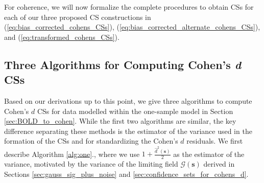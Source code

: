 For coherence, we will now formalize the complete procedures to obtain CSs for each of our three proposed CS constructions in (\ref{eq:bias_corrected_cohens_CSs}), (\ref{eq:bias_corrected_alternate_cohens_CSs}), and (\ref{eq:transformed_cohens_CSs}).

\subsection{Three Algorithms for Computing Cohen's \textit{d} CSs}
\label{sec:three_algorithms}
Based on our derivations up to this point, we give three algorithms to compute Cohen's $d$ CSs for data modelled within the one-sample model in Section \ref{sec:BOLD_to_cohen}. While the first two algorithms are similar, the key difference separating these methods is the estimator of the variance used in the formation of the CSs and for standardizing the Cohen's $d$ residuals. We first describe Algorithm \ref{alg:one}., where we use $1 + \frac{\hat{d}^{2}(\bm{s})}{2}$ as the estimator of the variance, motivated by the variance of the limiting field $\mathcal{G}(\bm{s})$ derived in Sections \ref{sec:gauss_sig_plus_noise} and \ref{sec:confidence_sets_for_cohens_d}.

